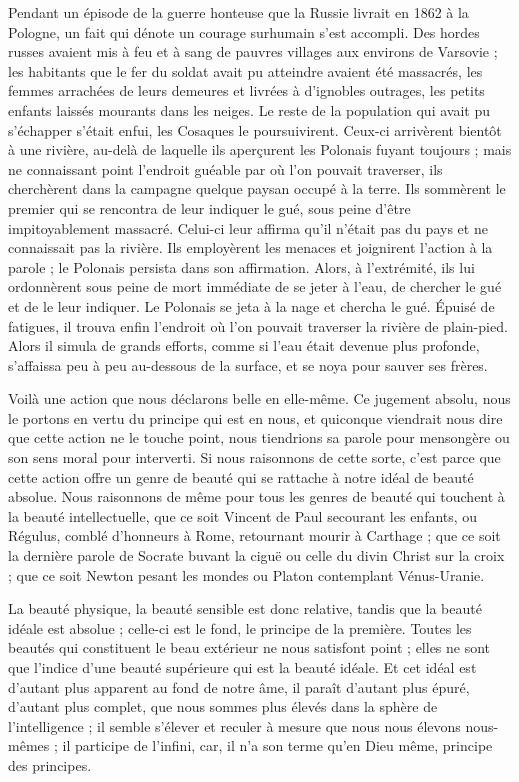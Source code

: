 \documentclass[a4paper, 11pt, oneside, landscape]{article}
\begin{document}
Pendant un épisode de la guerre honteuse que la Russie livrait en 1862 à la Pologne, un fait qui dénote un courage surhumain s'est accompli. Des hordes russes avaient mis à feu et à sang de pauvres villages aux environs de Varsovie ; les habitants que le fer du soldat avait pu atteindre avaient été massacrés, les femmes arrachées de leurs demeures et livrées à d'ignobles outrages, les petits enfants laissés mourants dans les neiges. Le reste de la population qui avait pu s'échapper s'était enfui, les Cosaques le poursuivirent. Ceux-ci arrivèrent bientôt à une rivière, au-delà de laquelle ils aperçurent les Polonais fuyant toujours ; mais ne connaissant point l'endroit guéable par où l'on pouvait traverser, ils cherchèrent dans la campagne quelque paysan occupé à la terre. Ils sommèrent le premier qui se rencontra de leur indiquer le gué, sous peine d'être impitoyablement massacré. Celui-ci leur affirma qu'il n'était pas du pays et ne connaissait pas la rivière. Ils employèrent les menaces et joignirent l'action à la parole ; le Polonais persista dans son affirmation. Alors, à l'extrémité, ils lui ordonnèrent sous peine de mort immédiate de se jeter à l'eau, de chercher le gué et de le leur indiquer. Le Polonais se jeta à la nage et chercha le gué. Épuisé de fatigues, il trouva enfin l'endroit où l'on pouvait traverser la rivière de plain-pied. Alors il simula de grands efforts, comme si l'eau était devenue plus profonde, s'affaissa peu à peu au-dessous de la surface, et se noya pour sauver ses frères.

Voilà une action que nous déclarons belle en elle-même. Ce jugement absolu, nous le portons en vertu du principe qui est en nous, et quiconque viendrait nous dire que cette action ne le touche point, nous tiendrions sa parole pour mensongère ou son sens moral pour interverti. Si nous raisonnons de cette sorte, c'est parce que cette action offre un genre de beauté qui se rattache à notre idéal de beauté absolue. Nous raisonnons de même pour tous les genres de beauté qui touchent à la beauté intellectuelle, que ce soit Vincent de Paul secourant les enfants, ou Régulus, comblé d'honneurs à Rome, retournant mourir à Carthage ; que ce soit la dernière parole de Socrate buvant la ciguë ou celle du divin Christ sur la croix ; que ce soit Newton pesant les mondes ou Platon contemplant Vénus-Uranie.

La beauté physique, la beauté sensible est donc relative, tandis que la beauté idéale est absolue ; celle-ci est le fond, le principe de la première. Toutes les beautés qui constituent le beau extérieur ne nous satisfont point ; elles ne sont que l'indice d'une beauté supérieure qui est la beauté idéale. Et cet idéal est d'autant plus apparent au fond de notre âme, il paraît d'autant plus épuré, d'autant plus complet, que nous sommes plus élevés dans la sphère de l'intelligence ; il semble s'élever et reculer à mesure que nous nous élevons nous-mêmes ; il participe de l'infini, car, il n'a son terme qu'en Dieu même, principe des principes.
\end{document}
